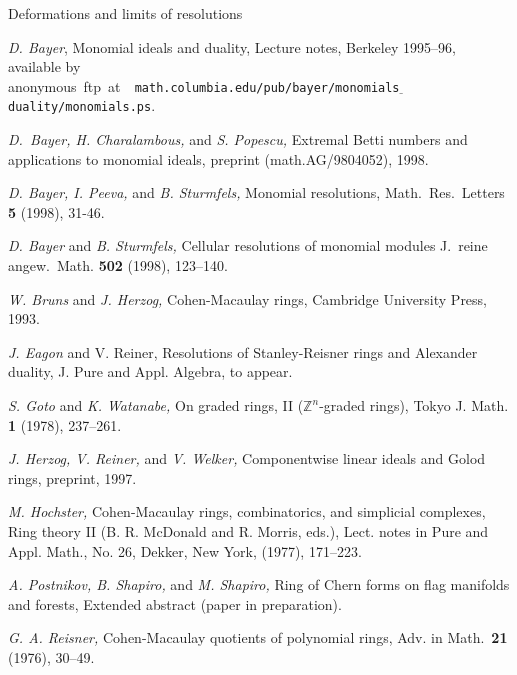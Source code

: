 \documentclass[12pt,leqno]{article}
\def\ZZ{{\mathbb Z}}
\begin{document}
\begin{section}{Deformations and limits of resolutions}
\end{section}%
\begin{thebibliography}{99}%
\baselineskip 14.0pt


 {\it D. Bayer}, Monomial ideals and duality, Lecture
notes, Berkeley 1995--96, available by\\ anonymous~ftp~at~{\tt
math.columbia.edu/pub/bayer/monomials$\underline{\
}$duality/monomials.ps}.

 {\it D.~Bayer, H. Charalambous,} and {\it S. Popescu,}
Extremal Betti numbers and applications to monomial ideals, preprint
(math.AG/9804052), 1998.

 {\it D. Bayer, I. Peeva,} and {\it B. Sturmfels,} Monomial
resolutions, Math.\ Res.\ Letters {\bf 5} (1998), 31-46.

 {\it D. Bayer} and {\it B. Sturmfels,} Cellular resolutions
of monomial modules
J.\ reine angew.\ Math. {\bf 502} (1998), 123--140.

 {\it W. Bruns} and {\it J. Herzog,} Cohen-Macaulay rings,
Cambridge University Press, 1993.

 {\it J. Eagon} and {V. Reiner,} Resolutions of
Stanley-Reisner rings and Alexander duality, J. Pure and Appl. Algebra,
to appear.

 {\it S. Goto} and {\it K. Watanabe,} On graded rings, II
($\ZZ^n$-graded rings), Tokyo J. Math. {\bf 1} (1978), 237--261.

 {\it J. Herzog, V. Reiner,} and {\it V. Welker,}
Componentwise linear ideals and Golod rings, preprint, 1997.

 {\it M. Hochster,} Cohen-Macaulay rings, combinatorics, and
simplicial complexes, Ring theory II (B. R. McDonald and R. Morris,
eds.), Lect. notes in Pure and Appl. Math., No. 26, Dekker, New York,
(1977), 171--223.

 {\it A. Postnikov, B. Shapiro,} and {\it M. Shapiro,} Ring
of Chern forms on flag manifolds and forests, Extended abstract (paper
in preparation).

 {\it G. A. Reisner,} Cohen-Macaulay quotients of polynomial
rings, Adv. in Math.\ {\bf 21} (1976), 30--49.


\end{thebibliography}
\end{document}
